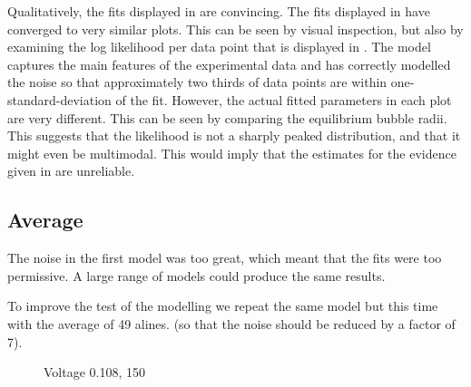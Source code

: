 Qualitatively, the fits displayed in  are convincing.
The fits displayed in  have converged to very similar plots.
This can be seen by visual inspection,
but also by examining the log likelihood per data point that is displayed in .
The model captures the main features of the experimental data
and has  correctly modelled the  noise so that approximately two thirds of data points are within one-standard-deviation of
the fit.
However, the actual fitted parameters in each plot are very different.
This can be seen  by comparing the equilibrium bubble radii.
This suggests that the likelihood is  not a sharply peaked distribution,
and that it might even be multimodal.
This would imply that the estimates for the evidence given in  are unreliable.




\subsection{Average}

The noise in the first model was too great, which meant that the fits were too permissive.
A large range of models could produce the same results.

To improve the test of the modelling we repeat the same model but this time with the average of 49 alines.
(so that the noise should be reduced by a factor of 7).



\begin{figure}[t]%
  \centering
  \subfloat[1st pulse - 1000]{
    \label{fig::plot_bubble_fit_108_150_av:first}
    }
\caption{Voltage 0.108, 150}
\end{figure}


